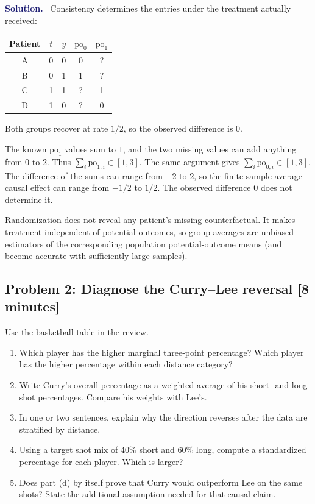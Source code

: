 \documentclass[11pt]{article}
\newenvironment{answer}{%
    \par\medskip\noindent\textcolor{MidnightBlue}{\textbf{Solution.}}\ }
    {\par\medskip}
\newcommand{\workingspace}[1]{}
\newcommand{\workingspace}[1]{\vspace{#1}}
\begin{document}
\begin{answer}
Consistency determines the entries under the treatment actually received:
\begin{center}
\begin{tabular}{@{}ccccc@{}}
\toprule
Patient & $t$ & $y$ & $\mathrm{po}_0$ & $\mathrm{po}_1$ \\
\midrule
A & 0 & 0 & 0 & ? \\
B & 0 & 1 & 1 & ? \\
C & 1 & 1 & ? & 1 \\
D & 1 & 0 & ? & 0 \\
\bottomrule
\end{tabular}
\end{center}
Both groups recover at rate $1/2$, so the observed difference is $0$.

The known $\mathrm{po}_1$ values sum to $1$, and the two missing values can add
anything from $0$ to $2$. Thus $\sum_i\mathrm{po}_{1,i}\in[1,3]$. The same
argument gives $\sum_i\mathrm{po}_{0,i}\in[1,3]$. The difference of the sums
can range from $-2$ to $2$, so the finite-sample average causal effect can range
from $-1/2$ to $1/2$. The observed difference $0$ does not determine it.

Randomization does not reveal any patient's missing counterfactual. It makes
treatment independent of potential outcomes, so group averages are unbiased
estimators of the corresponding population potential-outcome means (and become
accurate with sufficiently large samples).
\end{answer}

\newpage
\subsection*{Problem 2: Diagnose the Curry--Lee reversal \hfill [8 minutes]}
Use the basketball table in the review.
\begin{enumerate}[label=(\alph*),itemsep=0.45em]
  \item Which player has the higher marginal three-point percentage? Which
        player has the higher percentage within each distance category?
  \item Write Curry's overall percentage as a weighted average of his short- and
        long-shot percentages. Compare his weights with Lee's.
  \item In one or two sentences, explain why the direction reverses after the
        data are stratified by distance.
  \item Using a target shot mix of $40\%$ short and $60\%$ long, compute a
        standardized percentage for each player. Which is larger?
  \item Does part (d) by itself prove that Curry would outperform Lee on the
        same shots? State the additional assumption needed for that causal claim.
\end{enumerate}
\workingspace{5.5cm}
\end{document}
